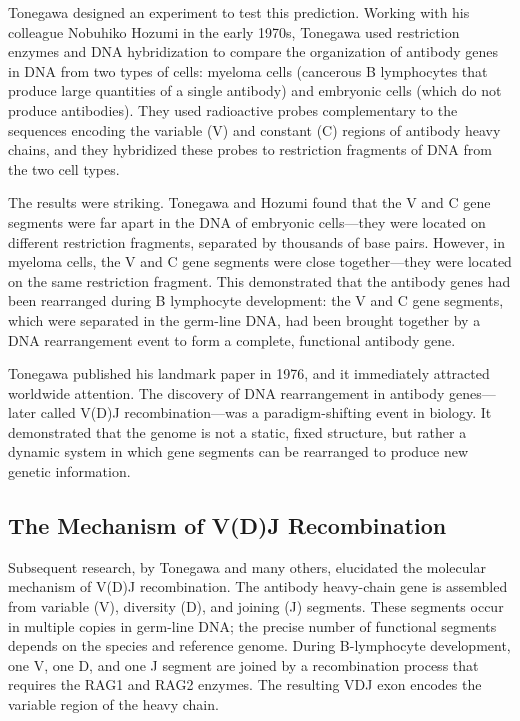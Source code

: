 Tonegawa designed an experiment to test this prediction. Working with his colleague Nobuhiko Hozumi in the early 1970s, Tonegawa used restriction enzymes and DNA hybridization to compare the organization of antibody genes in DNA from two types of cells: myeloma cells (cancerous B lymphocytes that produce large quantities of a single antibody) and embryonic cells (which do not produce antibodies). They used radioactive probes complementary to the sequences encoding the variable (V) and constant (C) regions of antibody heavy chains, and they hybridized these probes to restriction fragments of DNA from the two cell types.

The results were striking. Tonegawa and Hozumi found that the V and C gene segments were far apart in the DNA of embryonic cells---they were located on different restriction fragments, separated by thousands of base pairs. However, in myeloma cells, the V and C gene segments were close together---they were located on the same restriction fragment. This demonstrated that the antibody genes had been rearranged during B lymphocyte development: the V and C gene segments, which were separated in the germ-line DNA, had been brought together by a DNA rearrangement event to form a complete, functional antibody gene.

Tonegawa published his landmark paper in 1976, and it immediately attracted worldwide attention. The discovery of DNA rearrangement in antibody genes---later called V(D)J recombination---was a paradigm-shifting event in biology. It demonstrated that the genome is not a static, fixed structure, but rather a dynamic system in which gene segments can be rearranged to produce new genetic information.

\subsection{The Mechanism of V(D)J Recombination}

Subsequent research, by Tonegawa and many others, elucidated the molecular mechanism of V(D)J recombination. The antibody heavy-chain gene is assembled from variable (V), diversity (D), and joining (J) segments. These segments occur in multiple copies in germ-line DNA; the precise number of functional segments depends on the species and reference genome. During B-lymphocyte development, one V, one D, and one J segment are joined by a recombination process that requires the RAG1 and RAG2 enzymes. The resulting VDJ exon encodes the variable region of the heavy chain.

